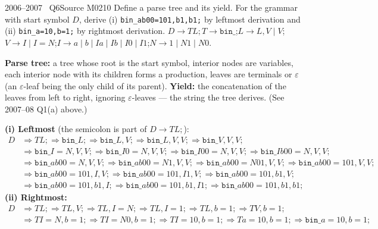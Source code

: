 \documentclass[11pt,a4paper]{article}
\newcommand{\eps}{\varepsilon}
\begin{document}
\begin{question}{2006--2007 \textbullet\ Q6}{Source M02}{10}
Define a parse tree and its yield. For the grammar with start symbol $D$, derive (i) \texttt{bin\_ab00=101,b1,b1;} by leftmost derivation and (ii) \texttt{bin\_a=10,b=1;} by rightmost derivation.
$D\to TL;$\quad $T\to\texttt{bin\_}$;\quad $L\to L,V\mid V$;\quad $V\to I\mid I{=}N$;\quad $I\to a\mid b\mid Ia\mid Ib\mid I0\mid I1$;\quad $N\to1\mid N1\mid N0$.
\end{question}
\begin{solution}
\textbf{Parse tree:} a tree whose root is the start symbol, interior nodes are variables, each interior node with its children forms a production, leaves are terminals or $\eps$ (an $\eps$-leaf being the only child of its parent). \textbf{Yield:} the concatenation of the leaves from left to right, ignoring $\eps$-leaves --- the string the tree derives. (See 2007--08 Q1(a) above.)

\textbf{(i) Leftmost} (the semicolon is part of $D\to TL;$):
\[\begin{aligned}
D&\Rightarrow TL;\Rightarrow\texttt{bin\_}L;\Rightarrow\texttt{bin\_}L,V;\Rightarrow\texttt{bin\_}L,V,V;\Rightarrow\texttt{bin\_}V,V,V;\\
&\Rightarrow\texttt{bin\_}I{=}N,V,V;\Rightarrow\texttt{bin\_}I0{=}N,V,V;\Rightarrow\texttt{bin\_}I00{=}N,V,V;\Rightarrow\texttt{bin\_}Ib00{=}N,V,V;\\
&\Rightarrow\texttt{bin\_}ab00{=}N,V,V;\Rightarrow\texttt{bin\_}ab00{=}N1,V,V;\Rightarrow\texttt{bin\_}ab00{=}N01,V,V;\Rightarrow\texttt{bin\_}ab00{=}101,V,V;\\
&\Rightarrow\texttt{bin\_}ab00{=}101,I,V;\Rightarrow\texttt{bin\_}ab00{=}101,I1,V;\Rightarrow\texttt{bin\_}ab00{=}101,b1,V;\\
&\Rightarrow\texttt{bin\_}ab00{=}101,b1,I;\Rightarrow\texttt{bin\_}ab00{=}101,b1,I1;\Rightarrow\texttt{bin\_}ab00{=}101,b1,b1;
\end{aligned}\]
\textbf{(ii) Rightmost:}
\[\begin{aligned}
D&\Rightarrow TL;\Rightarrow TL,V;\Rightarrow TL,I{=}N;\Rightarrow TL,I{=}1;\Rightarrow TL,b{=}1;\Rightarrow TV,b{=}1;\\
&\Rightarrow TI{=}N,b{=}1;\Rightarrow TI{=}N0,b{=}1;\Rightarrow TI{=}10,b{=}1;\Rightarrow Ta{=}10,b{=}1;\Rightarrow\texttt{bin\_}a{=}10,b{=}1;
\end{aligned}\]
\end{solution}
\end{document}
